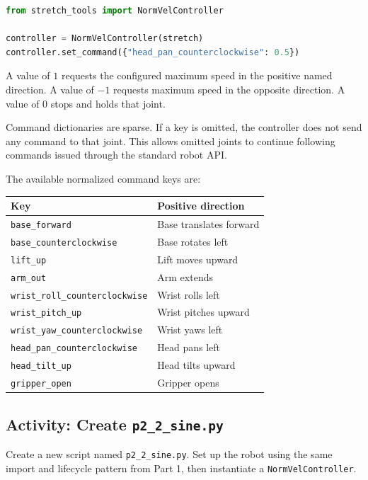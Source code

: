 \documentclass[11pt,a4paper]{article}
\begin{document}
\begin{lstlisting}[language=Python]
from stretch_tools import NormVelController

controller = NormVelController(stretch)
controller.set_command({"head_pan_counterclockwise": 0.5})
\end{lstlisting}

A value of $1$ requests the configured maximum speed in the positive named
direction. A value of $-1$ requests maximum speed in the opposite direction.
A value of $0$ stops and holds that joint.

Command dictionaries are sparse. If a key is omitted, the controller does not
send any command to that joint. This allows omitted joints to continue following
commands issued through the standard robot API.

The available normalized command keys are:

\begin{center}
\begin{tabular}{|l|l|}
\hline
\textbf{Key} & \textbf{Positive direction} \\
\hline
\texttt{base\_forward} & Base translates forward \\
\texttt{base\_counterclockwise} & Base rotates left \\
\texttt{lift\_up} & Lift moves upward \\
\texttt{arm\_out} & Arm extends \\
\texttt{wrist\_roll\_counterclockwise} & Wrist rolls left \\
\texttt{wrist\_pitch\_up} & Wrist pitches upward \\
\texttt{wrist\_yaw\_counterclockwise} & Wrist yaws left \\
\texttt{head\_pan\_counterclockwise} & Head pans left \\
\texttt{head\_tilt\_up} & Head tilts upward \\
\texttt{gripper\_open} & Gripper opens \\
\hline
\end{tabular}
\end{center}

\subsection*{Activity: Create \texttt{p2\_2\_sine.py}}

Create a new script named \texttt{p2\_2\_sine.py}. Set up the robot using the
same import and lifecycle pattern from Part 1, then instantiate a
\texttt{NormVelController}.
\end{document}
